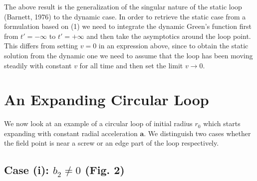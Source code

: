\documentclass[12pt]{article}
\begin{document}
The above result is the generalization of the singular nature of the static loop (Barnett, 1976) to the dynamic case. In order to retrieve the static case from a formulation based on (1) we need to integrate the dynamic Green's function first from $t'=-\infty$ to $t'=+\infty$ and then take the asymptotics around the loop point. This differs from setting $v=0$ in an expression above, since to obtain the static solution from the dynamic one we need to assume that the loop has been moving steadily with constant $v$ for all time and then set the limit $v\to 0$.

\section{An Expanding Circular Loop}

We now look at an example of a circular loop of initial radius $r_0$ which starts expanding with constant radial acceleration $\mathbf{a}$. We distinguish two cases whether the field point is near a screw or an edge part of the loop respectively.

\subsection*{Case (i): $b_2 \neq 0$ (Fig. 2)}
\end{document}
